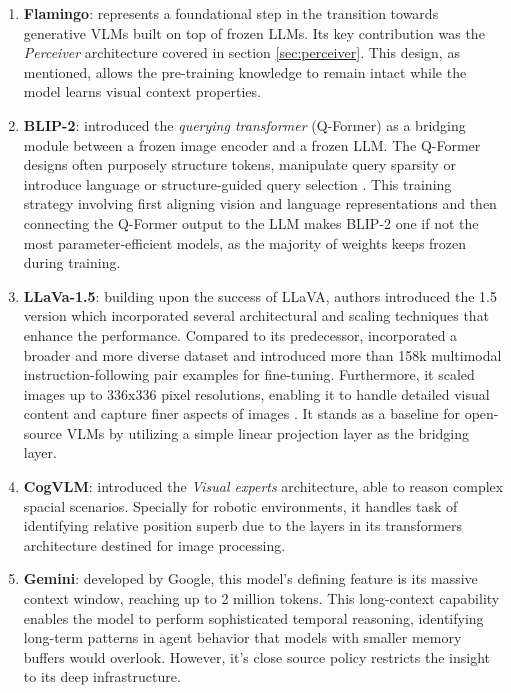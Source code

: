 \begin{enumerate}
	\item \textbf{Flamingo}: represents a foundational step in the transition towards generative VLMs built on top of frozen LLMs. Its key contribution was the \textit{Perceiver} architecture covered in section \ref{sec:perceiver}. This design, as mentioned, allows the pre-training knowledge to remain intact while the model learns visual context properties. 
	
	\item \textbf{BLIP-2}: introduced the \textit{querying transformer} (Q-Former) as a bridging module between a frozen image encoder and a frozen LLM. The Q-Former designs often purposely structure tokens, manipulate query sparsity or introduce language or structure-guided query selection \cite{li2023blip2}. This training strategy involving first aligning vision and language representations and then connecting the Q-Former output to the LLM makes BLIP-2 one if not the most parameter-efficient models, as the majority of weights keeps frozen during training.
	
	\item \textbf{LLaVa-1.5}: building upon the success of LLaVA, authors introduced the 1.5 version which incorporated several architectural and scaling techniques that enhance the performance. Compared to its predecessor, incorporated a broader and more diverse dataset and introduced more than 158k multimodal instruction-following pair examples for fine-tuning. Furthermore, it scaled images up to 336x336 pixel resolutions, enabling it to handle detailed visual content and capture finer aspects of images \cite{llava_medium_2023}. It stands as a baseline for open-source VLMs by utilizing a simple linear projection layer as the bridging layer. 
	
	\item \textbf{CogVLM}: introduced the \textit{Visual experts} architecture, able to reason complex spacial scenarios. Specially for robotic environments, it handles task of identifying relative position superb due to the layers in its transformers architecture destined for image processing. 
	
	\item \textbf{Gemini}: developed by Google, this model's defining feature is its massive context window, reaching up to 2 million tokens. This long-context capability enables the model to perform sophisticated temporal reasoning, identifying long-term patterns in agent behavior that models with smaller memory buffers would overlook. However, it's close source policy restricts the insight to its deep infrastructure. 
	

\end{enumerate}
